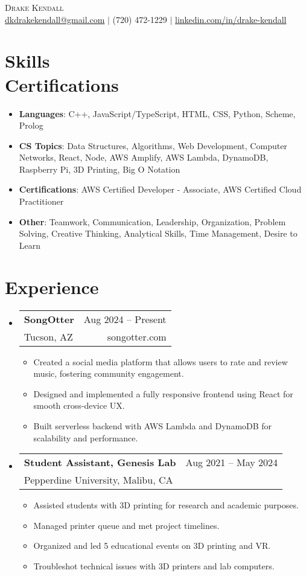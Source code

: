 \documentclass[letterpaper,11pt]{article}
\makeatletter
\newcommand{\resumeItem}[1]{
  \item\small{#1 \vspace{-2pt}}
}
\newcommand{\resumeSubheading}[4]{
  \vspace{-2pt}\item
    \begin{tabular*}{0.97\textwidth}[t]{l@{\extracolsep{\fill}}r}
      \textbf{#1} & {\small #2} \\
      {\small #3} & {\small #4} \\
    \end{tabular*}\vspace{-7pt}
}
\newcommand{\resumeItemListStart}{\begin{itemize}}
\newcommand{\resumeItemListEnd}{\end{itemize}\vspace{-5pt}}
\newcommand{\resumeSubHeadingListStart}{\begin{itemize}[leftmargin=0.15in, label={}]}
\newcommand{\resumeSubHeadingListEnd}{\end{itemize}}
\makeatother
\begin{document}
\begin{center}
    {\Huge \scshape Drake Kendall} \\ \vspace{1pt}
    \href{mailto:dkdrakekendall@gmail.com}{dkdrakekendall@gmail.com} $|$
    (720) 472-1229 $|$
    \href{https://www.linkedin.com/in/drake-kendall}{linkedin.com/in/drake-kendall}
\end{center}

\section{Skills \\ \normalfont\normalsize Certifications}
\begin{itemize}[leftmargin=0.15in, label={}]
    \item \textbf{Languages}{: C++, JavaScript/TypeScript, HTML, CSS, Python, Scheme, Prolog}
    \item \textbf{CS Topics}{: Data Structures, Algorithms, Web Development, Computer Networks, React, Node, AWS Amplify, AWS Lambda, DynamoDB, Raspberry Pi, 3D Printing, Big O Notation}
    \item \textbf{Certifications}{: AWS Certified Developer - Associate, AWS Certified Cloud Practitioner}
    \item \textbf{Other}{: Teamwork, Communication, Leadership, Organization, Problem Solving, Creative Thinking, Analytical Skills, Time Management, Desire to Learn}
\end{itemize}

\section{Experience}
\resumeSubHeadingListStart
  \resumeSubheading
    {SongOtter}{Aug 2024 -- Present}
    {Tucson, AZ}{songotter.com}
    \resumeItemListStart
      \resumeItem{Created a social media platform that allows users to rate and review music, fostering community engagement.}
      \resumeItem{Designed and implemented a fully responsive frontend using React for smooth cross-device UX.}
      \resumeItem{Built serverless backend with AWS Lambda and DynamoDB for scalability and performance.}
    \resumeItemListEnd

  \resumeSubheading
    {Student Assistant, Genesis Lab}{Aug 2021 -- May 2024}
    {Pepperdine University, Malibu, CA}{}
    \resumeItemListStart
      \resumeItem{Assisted students with 3D printing for research and academic purposes.}
      \resumeItem{Managed printer queue and met project timelines.}
      \resumeItem{Organized and led 5 educational events on 3D printing and VR.}
      \resumeItem{Troubleshot technical issues with 3D printers and lab computers.}
    \resumeItemListEnd
\resumeSubHeadingListEnd
\end{document}
